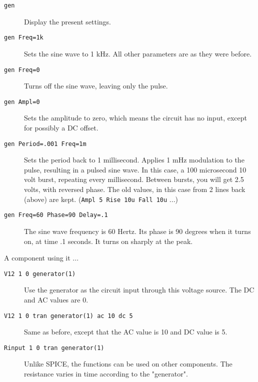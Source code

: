 \begin{description}

\item[{\tt gen}] Display the present settings.

\item[{\tt gen Freq=1k}] Sets the sine wave to 1 kHz.  All other parameters
are as they were before.

\item[{\tt gen Freq=0}] Turns off the sine wave, leaving only the pulse.

\item[{\tt gen Ampl=0}] Sets the amplitude to zero, which means the circuit
has no input, except for possibly a DC offset.

\item[{\tt gen Period=.001 Freq=1m}] Sets the period back to 1 millisecond.
Applies 1 mHz modulation to the pulse, resulting in a pulsed sine wave.  In
this case, a 100 microsecond 10 volt burst, repeating every millisecond.
Between bursts, you will get 2.5 volts, with reversed phase.  The old
values, in this case from 2 lines back (above) are kept.  ({\tt Ampl 5 Rise
10u Fall 10u} ...)

\item[{\tt gen Freq=60 Phase=90 Delay=.1}] The sine wave frequency is 60
Hertz.  Its phase is 90 degrees when it turns on, at time .1 seconds.  It
turns on sharply at the peak.

\end{description}

A component using it ...

\begin{description}

\item[{\tt V12 1 0 generator(1)}] Use the generator as the circuit
input through this voltage source.  The DC and AC values are 0.

\item[{\tt V12 1 0 tran generator(1) ac 10 dc 5}] Same as before, except
that the AC value is 10 and DC value is 5.

\item[{\tt Rinput 1 0 tran generator(1)}] Unlike SPICE, the functions
can be used on other components.  The resistance varies in time
according to the "generator".

\end{description}

